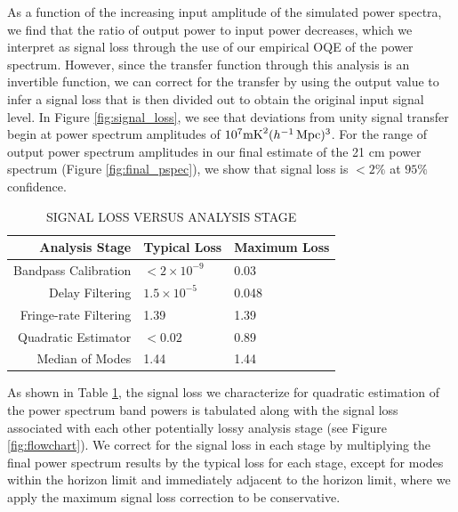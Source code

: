 \documentclass[twocolumn,numberedappendix]{emulateapj} \shorttitle{New Limits on the 21 cm Power Spectrum at $z=8.4$}
\begin{document}
As a function of the increasing input amplitude of the simulated power spectra,
we find that the ratio of output power to input power decreases, which we interpret
 as signal loss through the use of our empirical OQE of the power spectrum.  
However, since the transfer function through this analysis is an invertible function,
we can correct for the transfer by using the output value to infer a signal loss
that is then divided out to obtain the original input signal level.  In Figure \ref{fig:signal_loss},
we see that
deviations from unity signal transfer begin at
power spectrum amplitudes of $10^{7} \text{mK}^{2} (h^{-1}\rm
\,\text{Mpc})^{3}$. For the range of output power spectrum amplitudes in our
final estimate of the 21 cm power spectrum (Figure \ref{fig:final_pspec}), we
show that signal loss is $<2\%$ at $95\%$ confidence. 

\begin{table}[htdp]
\caption{SIGNAL LOSS VERSUS ANALYSIS STAGE}
\begin{center}
\begin{tabular}{rll}
Analysis Stage & Typical Loss & Maximum Loss \\
\hline
Bandpass Calibration &  $< 2 \times 10^{-9}$ & 0.03 \\
Delay Filtering & $1.5\times10^{-5}$ & 0.048 \\
Fringe-rate Filtering & 1.39 & 1.39 \\
Quadratic Estimator & $<0.02$ & 0.89 \\
Median of Modes & 1.44 & 1.44 \\
\end{tabular}
\end{center}
\label{tbl:sigloss}
\end{table}%

As shown in Table \ref{tbl:sigloss}, the signal loss we characterize for quadratic
estimation of the power spectrum band powers is tabulated along with the signal
loss associated with each other potentially lossy analysis stage (see Figure \ref{fig:flowchart}).
We correct for the signal loss in each stage by multiplying the final power spectrum results
by the typical loss for each stage, except for modes within the horizon limit and immediately
adjacent to the horizon limit, where we apply the maximum signal loss correction to be conservative.

\end{document}
